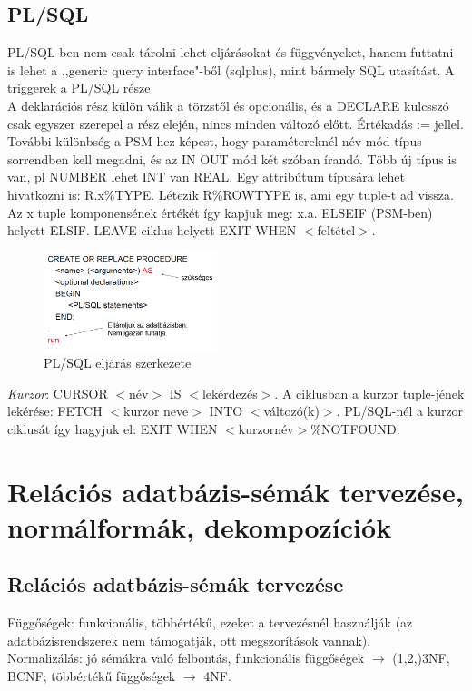 \documentclass[margin=0px]{article}
\begin{document}
\subsection{PL/SQL}

PL/SQL-ben nem csak tárolni lehet eljárásokat és függvényeket, hanem futtatni is lehet a ,,generic query interface"-ből (sqlplus), mint bármely SQL utasítást. A triggerek a PL/SQL része. \\
A deklarációs rész külön válik a törzstől és opcionális, és a DECLARE kulcsszó csak egyszer szerepel a rész elején, nincs minden változó előtt. Értékadás := jellel. További különbség a PSM-hez képest, hogy paramétereknél név-mód-típus sorrendben kell megadni, és az IN OUT mód két szóban írandó. Több új típus is van, pl NUMBER lehet INT van REAL. Egy attribútum típusára lehet hivatkozni is: R.x\%TYPE. Létezik R\%ROWTYPE is,  ami egy tuple-t ad vissza. Az x tuple komponensének értékét így kapjuk meg: x.a.  ELSEIF (PSM-ben) helyett ELSIF. LEAVE ciklus helyett EXIT WHEN $<$feltétel$>$.
\begin{figure}[H]
    \centering
    \includegraphics[width=0.45\textwidth]{img/plsql1.png}
    \caption{PL/SQL eljárás szerkezete}
\end{figure}
\textit{Kurzor}: CURSOR $<$név$>$ IS $<$lekérdezés$>$. A ciklusban a kurzor tuple-jének lekérése: FETCH $<$kurzor neve$>$ INTO $<$változó(k)$>$. PL/SQL-nél a kurzor ciklusát így hagyjuk el: EXIT WHEN $<$kurzornév$>$\%NOTFOUND.
\section{Relációs adatbázis-sémák tervezése, normálformák, dekompozíciók}

\subsection{Relációs adatbázis-sémák tervezése}

Függőségek: funkcionális, többértékű, ezeket a tervezésnél használják (az adatbázisrendszerek nem támogatják, ott megszorítások vannak). \\
Normalizálás: jó sémákra való felbontás, funkcionális függőségek $\to$ (1,2,)3NF, BCNF; többértékű függőségek $\to$ 4NF.
\end{document}
